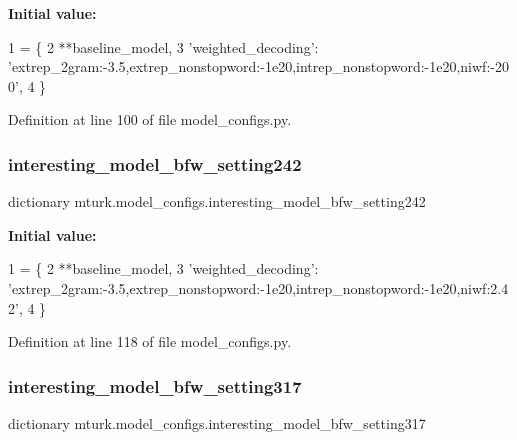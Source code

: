 {\bfseries Initial value\+:}
\begin{DoxyCode}
1 =  \{
2     **baseline\_model,
3     \textcolor{stringliteral}{'weighted\_decoding'}: \textcolor{stringliteral}{'extrep\_2gram:-3.5,extrep\_nonstopword:-1e20,intrep\_nonstopword:-1e20,niwf:-200'},
4 \}
\end{DoxyCode}


Definition at line 100 of file model\+\_\+configs.\+py.

\mbox{\label{namespacemturk_1_1model__configs_a55169a5d34f0f580a696ce6e4954bc44}} 
\subsubsection{\texorpdfstring{interesting\+\_\+model\+\_\+bfw\+\_\+setting242}{interesting\_model\_bfw\_setting242}}
{\footnotesize\ttfamily dictionary mturk.\+model\+\_\+configs.\+interesting\+\_\+model\+\_\+bfw\+\_\+setting242}

{\bfseries Initial value\+:}
\begin{DoxyCode}
1 =  \{
2     **baseline\_model,
3     \textcolor{stringliteral}{'weighted\_decoding'}: \textcolor{stringliteral}{'extrep\_2gram:-3.5,extrep\_nonstopword:-1e20,intrep\_nonstopword:-1e20,niwf:2.42'},
4 \}
\end{DoxyCode}


Definition at line 118 of file model\+\_\+configs.\+py.

\mbox{\label{namespacemturk_1_1model__configs_a41b85bd8d23c7a70e4e650700cd1ea0b}} 
\subsubsection{\texorpdfstring{interesting\+\_\+model\+\_\+bfw\+\_\+setting317}{interesting\_model\_bfw\_setting317}}
{\footnotesize\ttfamily dictionary mturk.\+model\+\_\+configs.\+interesting\+\_\+model\+\_\+bfw\+\_\+setting317}

